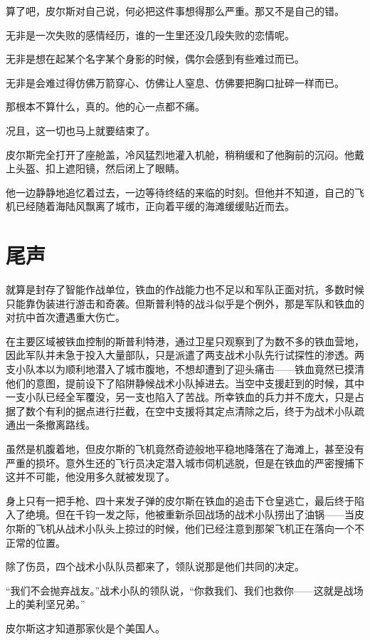 算了吧，皮尔斯对自己说，何必把这件事想得那么严重。那又不是自己的错。

无非是一次失败的感情经历，谁的一生里还没几段失败的恋情呢。

无非是想在起某个名字某个身影的时候，偶尔会感到有些难过而已。

无非是会难过得仿佛万箭穿心、仿佛让人窒息、仿佛要把胸口扯碎一样而已。

那根本不算什么，真的。他的心一点都不痛。

况且，这一切也马上就要结束了。

皮尔斯完全打开了座舱盖，冷风猛烈地灌入机舱，稍稍缓和了他胸前的沉闷。他戴上头盔、扣上遮阳镜，然后闭上了眼睛。

他一边静静地追忆着过去，一边等待终结的来临的时刻。但他并不知道，自己的飞机已经随着海陆风飘离了城市，正向着平缓的海滩缓缓贴近而去。



\section*{尾声}

就算是封存了智能作战单位，铁血的作战能力也不足以和军队正面对抗，多数时候只能靠伪装进行游击和奇袭。但斯普利特的战斗似乎是个例外，那是军队和铁血的对抗中首次遭遇重大伤亡。

在主要区域被铁血控制的斯普利特港，通过卫星只观察到了为数不多的铁血营地，因此军队并未急于投入大量部队，只是派遣了两支战术小队先行试探性的渗透。两支小队本以为顺利地潜入了城市腹地，不想却遭到了迎头痛击——铁血竟然已摸清他们的意图，提前设下了陷阱静候战术小队掉进去。当空中支援赶到的时候，其中一支小队已经全军覆没，另一支也陷入了苦战。所幸铁血的兵力并不庞大，只是占据了数个有利的据点进行拦截，在空中支援将其定点清除之后，终于为战术小队疏通出一条撤离路线。

虽然是机腹着地，但皮尔斯的飞机竟然奇迹般地平稳地降落在了海滩上，甚至没有严重的损坏。意外生还的飞行员决定潜入城市伺机逃脱，但是在铁血的严密搜捕下这并不可能，他没用多久就被发现了。

身上只有一把手枪、四十来发子弹的皮尔斯在铁血的追击下仓皇逃亡，最后终于陷入了绝境。但在千钧一发之际，他被重新杀回战场的战术小队捞出了油锅——当皮尔斯的飞机从战术小队头上掠过的时候，他们已经注意到那架飞机正在落向一个不正常的位置。

除了伤员，四个战术小队队员都来了，领队说那是他们共同的决定。

“我们不会抛弃战友。”战术小队的领队说，“你救我们、我们也救你——这就是战场上的美利坚兄弟。”

皮尔斯这才知道那家伙是个美国人。

